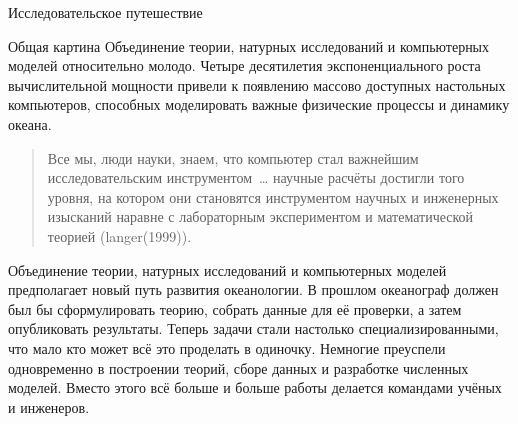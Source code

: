 \begin{chapter}{Исследовательское путешествие}
\begin{section}{Общая картина}
Объединение теории, натурных исследований и компьютерных моделей относительно 
молодо. Четыре десятилетия экспоненциального роста вычислительной мощности
привели к появлению массово доступных настольных компьютеров, способных 
моделировать важные физические процессы и динамику океана.
%

\begin{quotation}
Все мы, люди науки, знаем, что компьютер стал важнейшим исследовательским 
инструментом~\dots{} научные расчёты достигли того уровня, на котором 
они становятся инструментом научных и инженерных изысканий наравне
с лабораторным экспериментом и математической теорией (langer(1999)).
%
\end{quotation}


Объединение теории, натурных исследований и компьютерных моделей предполагает 
новый путь развития океанологии. В прошлом океанограф должен был бы сформулировать 
теорию, собрать данные для её проверки, а затем опубликовать результаты. 
Теперь задачи стали настолько специализированными, что мало кто может всё 
это проделать в одиночку. Немногие преуспели одновременно в построении теорий, 
сборе данных и разработке численных моделей. Вместо этого всё больше и больше 
работы делается командами учёных и инженеров.
%
\end{section}


\end{chapter}
